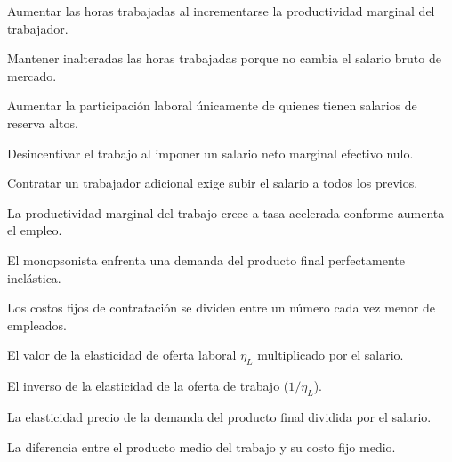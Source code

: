 \begin{opts}
    \item Aumentar las horas trabajadas al incrementarse la productividad marginal del trabajador.
    \item Mantener inalteradas las horas trabajadas porque no cambia el salario bruto de mercado.
    \item Aumentar la participación laboral únicamente de quienes tienen salarios de reserva altos.
    \item Desincentivar el trabajo al imponer un salario neto marginal efectivo nulo.
\end{opts}

\begin{opts}
    \item Contratar un trabajador adicional exige subir el salario a todos los previos.
    \item La productividad marginal del trabajo crece a tasa acelerada conforme aumenta el empleo.
    \item El monopsonista enfrenta una demanda del producto final perfectamente inelástica.
    \item Los costos fijos de contratación se dividen entre un número cada vez menor de empleados.
\end{opts}

\begin{opts}
    \item El valor de la elasticidad de oferta laboral $\eta_L$ multiplicado por el salario.
    \item El inverso de la elasticidad de la oferta de trabajo ($1 / \eta_L$).
    \item La elasticidad precio de la demanda del producto final dividida por el salario.
    \item La diferencia entre el producto medio del trabajo y su costo fijo medio.
\end{opts}

